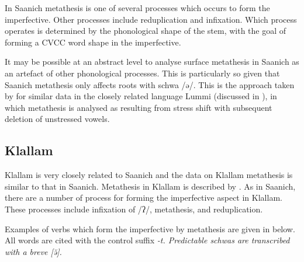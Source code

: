 In Saanich metathesis is one of several
processes which occurs to form the imperfective.
Other processes include reduplication and infixation.
Which process operates is determined by the phonological shape of the stem,
with the goal of forming a CVCC word shape in the imperfective.

It may be possible at an abstract level to analyse surface metathesis in Saanich
as an artefact of other phonological processes.
This is particularly so given that Saanich metathesis only affects roots with schwa /ə/.
This is the approach taken by \cite{de74} for similar data in the
closely related language Lummi (discussed in ),
in which metathesis is analysed as resulting from
stress shift with subsequent deletion of unstressed vowels.

\subsection{Klallam}\label{sec:Kla}
Klallam is very closely related to Saanich
and the data on Klallam metathesis is similar to that in Saanich.
Metathesis in Klallam is described by \cite{thth69}.
As in Saanich, there are a number of process for forming the imperfective aspect in Klallam.
These processes include infixation of /ʔ/, metathesis, and reduplication.

Examples of verbs which form the imperfective by metathesis
are given in  below.
All words are cited with the control suffix \it{-t}.
Predictable schwas are transcribed with a breve [ə̆].

